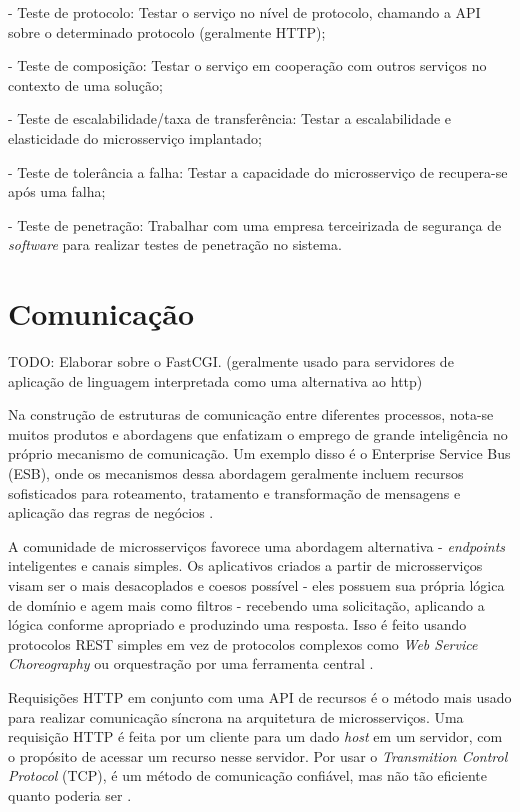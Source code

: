 - Teste de protocolo: Testar o serviço no nível de protocolo, chamando a API sobre o determinado protocolo (geralmente HTTP);

- Teste de composição: Testar o serviço em cooperação com outros serviços no contexto de uma solução;

- Teste de escalabilidade/taxa de transferência: Testar a escalabilidade e elasticidade do microsserviço implantado;

- Teste de tolerância a falha: Testar a capacidade do microsserviço de recupera-se após uma falha;

- Teste de penetração: Trabalhar com uma empresa terceirizada de segurança de \emph{software} para realizar testes de penetração no sistema.

\section{Comunicação}

TODO: Elaborar sobre o FastCGI. (geralmente usado para servidores de aplicação de linguagem interpretada como uma alternativa ao http)

Na construção de estruturas de comunicação entre diferentes processos, nota-se muitos produtos e abordagens que enfatizam o emprego de grande inteligência no próprio mecanismo de comunicação. Um exemplo disso é o Enterprise Service Bus (ESB), onde os mecanismos dessa abordagem geralmente incluem recursos sofisticados para roteamento, tratamento e transformação de mensagens e aplicação das regras de negócios \cite{martin-fowler-microservices}.

A comunidade de microsserviços favorece uma abordagem alternativa - \emph{endpoints} inteligentes e canais simples. Os aplicativos criados a partir de microsserviços visam ser o mais desacoplados e coesos possível - eles possuem sua própria lógica de domínio e agem mais como filtros - recebendo uma solicitação, aplicando a lógica conforme apropriado e produzindo uma resposta. Isso é feito usando protocolos REST simples em vez de protocolos complexos como \emph{Web Service Choreography} ou orquestração por uma ferramenta central \cite{martin-fowler-microservices}.

Requisições HTTP em conjunto com uma API de recursos é o método mais usado para realizar comunicação síncrona na arquitetura de microsserviços. Uma requisição HTTP é feita por um cliente para um dado \emph{host} em um servidor, com o propósito de acessar um recurso nesse servidor. Por usar o \emph{Transmition Control Protocol} (TCP), é um método de comunicação confiável, mas não tão eficiente quanto poderia ser \cite{martin-fowler-microservices}.

